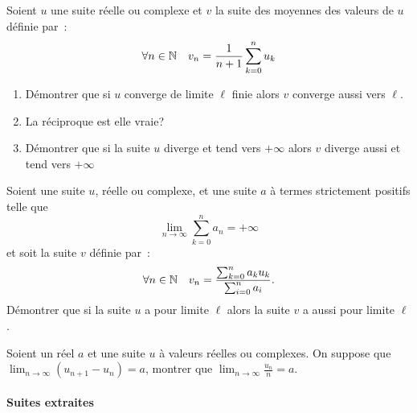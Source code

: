 \begin{exercice}
    Soient \(u\) une suite réelle ou complexe et \(v\) la suite des moyennes des valeurs de \(u\) définie par~:
    \[ \forall n \in \mathbb{N} \quad v_n = \frac{1}{n+1}\sum_{k = 0}^n u_k \]
    \begin{enumerate}
        \item Démontrer que si \(u\) converge de limite \(\ell\) finie alors \(v\) converge aussi vers \(\ell\).
        \item La réciproque est elle vraie?
        \item Démontrer que si la suite \(u\) diverge et tend vers \(+\infty\) alors \(v\) diverge aussi et tend vers \(+\infty\)
    \end{enumerate}    
\end{exercice}
\begin{exercice}
    Soient une suite \(u\), réelle ou complexe, et une suite \(a\) à termes strictement positifs telle que \[\lim_{n \to \infty} \sum_{k = 0}^n a_n = +\infty\] et soit la suite \(v\) définie par~:
    \[\forall n \in \mathbb{N} \quad v_n = \frac{\sum_{k = 0}^n a_k u_k}{\sum_{i = 0}^n a_i}.\]
    Démontrer que si la suite \(u\) a pour limite \(\ell\) alors la suite \(v\) a aussi pour limite \(\ell\).
\end{exercice}
\begin{exercice}
    Soient un réel \(a\) et une suite \(u\) à valeurs réelles ou complexes. On suppose que \(\lim_{n\to\infty} (u_{n+1}-u_n) = a\), montrer que \(\lim_{n\to\infty} \frac{u_n}{n} = a\).
\end{exercice}
\paragraph{Suites extraites}
~~

